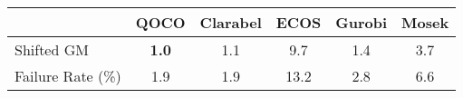 \begin{tabular}{lccccc}
  \hline
   & \textbf{QOCO} & \textbf{Clarabel} & \textbf{ECOS} & \textbf{Gurobi} & \textbf{Mosek} \\ \hline
  Shifted GM & \textbf{1.0} & 1.1 & 9.7 & 1.4 & 3.7 \\ 
  Failure Rate (\%) & 1.9 & 1.9 & 13.2 & 2.8 & 6.6 \\ \hline 
\end{tabular}
